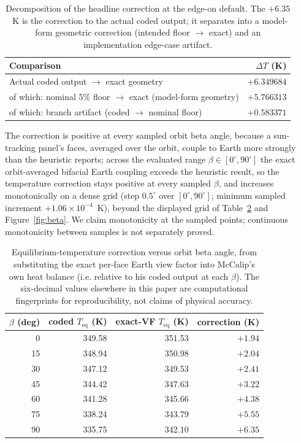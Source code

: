 \documentclass[11pt]{article}
\theoremstyle{remark}
\begin{document}
\begin{table}[t]
\centering
\caption{Decomposition of the headline correction at the edge-on default. The
$+6.35$~K is the correction to the actual coded output; it separates into a
model-form geometric correction (intended floor $\to$ exact) and an
implementation edge-case artifact.}
\label{tab:decomp}
\begin{tabular}{lr}
\toprule
Comparison & $\Delta T$ (K) \\
\midrule
Actual coded output $\to$ exact geometry          & $+6.349684$ \\
\quad of which: nominal $5\%$ floor $\to$ exact (model-form geometry) & $+5.766313$ \\
\quad of which: branch artifact (coded $\to$ nominal floor)            & $+0.583371$ \\
\bottomrule
\end{tabular}
\end{table}

The correction is positive at every sampled orbit beta angle, because a sun-tracking
panel's faces, averaged over the orbit, couple to Earth more strongly than the
heuristic reports; across the evaluated range $\beta\in[0^{\circ},90^{\circ}]$ the
exact orbit-averaged bifacial Earth coupling exceeds the heuristic result, so the
temperature correction stays positive at every sampled $\beta$, and increases
monotonically on a dense grid (step $0.5^{\circ}$ over $[0^{\circ},90^{\circ}]$;
minimum sampled increment $+1.06\times10^{-4}$~K), beyond the displayed grid of
Table~\ref{tab:beta} and Figure~\ref{fig:beta}. We claim monotonicity at the
sampled points; continuous monotonicity between samples is not separately proved.

\begin{table}[t]
\centering
\caption{Equilibrium-temperature correction versus orbit beta angle, from
substituting the exact per-face Earth view factor into McCalip's own heat balance
(i.e. relative to his coded output at each $\beta$). The six-decimal values
elsewhere in this paper are computational fingerprints for reproducibility, not
claims of physical accuracy.}
\label{tab:beta}
\begin{tabular}{rrrr}
\toprule
$\beta$ (deg) & coded $T_{\mathrm{eq}}$ (K) & exact-VF $T_{\mathrm{eq}}$ (K) & correction (K) \\
\midrule
0  & 349.58 & 351.53 & $+1.94$ \\
15 & 348.94 & 350.98 & $+2.04$ \\
30 & 347.12 & 349.53 & $+2.41$ \\
45 & 344.42 & 347.63 & $+3.22$ \\
60 & 341.28 & 345.66 & $+4.38$ \\
75 & 338.24 & 343.79 & $+5.55$ \\
90 & 335.75 & 342.10 & $+6.35$ \\
\bottomrule
\end{tabular}
\end{table}
\end{document}
